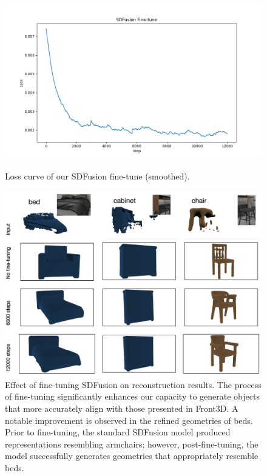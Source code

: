 \begin{figure}
  \centering
  \begin{minipage}{0.49\linewidth}
    \centering
  \includegraphics[width=\linewidth]{figs/sdfusion_finetune_loss_plot.png}
    \caption{Loss curve of our SDFusion fine-tune (smoothed).}
  \label{fig:finetune}
  \end{minipage}
  \hfill
  \begin{minipage}{0.49\linewidth}
    \centering
  \includegraphics[width=\linewidth]{images/image4.png}
    \caption{Effect of fine-tuning SDFusion on reconstruction results. The process of fine-tuning significantly enhances our capacity to generate objects that more accurately align with those presented in Front3D. A notable improvement is observed in the refined geometries of beds. Prior to fine-tuning, the standard SDFusion model produced representations resembling armchairs; however, post-fine-tuning, the model successfully generates geometries that appropriately resemble beds.}
    \label{fig:short-b}
  \end{minipage}
\end{figure}

